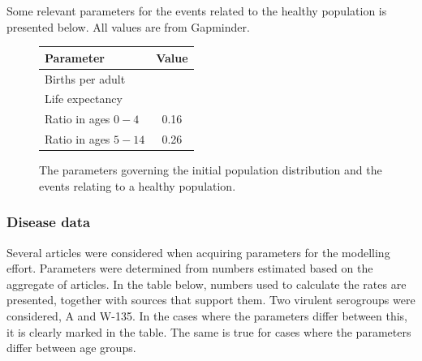 \documentclass[10pt,a4paper]{article}
\begin{document}
Some relevant parameters for the events related to the healthy population is presented below. All values are from Gapminder.

\begin{figure}
	\begin{tabular}{|l|c|}
		\hline
		Parameter				& Value \\ \hline
		Births per adult		&		\\
		Life expectancy			&		\\
		Ratio in ages $0-4$		& 0.16	\\
		Ratio in ages $5-14$	& 0.26
	\end{tabular}
	\caption{The parameters governing the initial population distribution and the events relating to a healthy population.} \label{table:pars:healthy}
\end{figure}

\subsubsection{Disease data}

Several articles were considered when acquiring parameters for the modelling effort. Parameters were determined from numbers estimated based on the aggregate of articles. In the table below, numbers used to calculate the rates are presented, together with sources that support them. Two virulent serogroups were considered, A and W-135. In the cases where the parameters differ between this, it is clearly marked in the table. The same is true for cases where the parameters differ between age groups.
\end{document}
